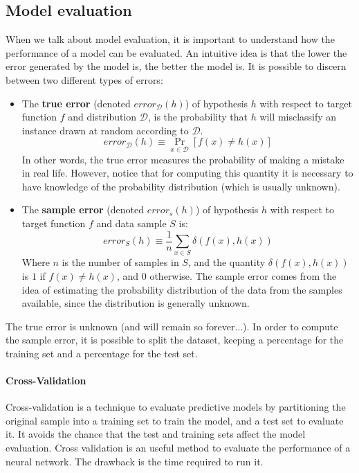 \subsection{Model evaluation}
When we talk about model evaluation, it is important to understand how the performance of a model can be evaluated. An intuitive idea is that the lower the error generated by the model is, the better the model is. It is possible to discern between two different types of errors:
\begin{itemize}
	\item The \textbf{true error} (denoted $error_{\mathcal{D}}(h)$) of hypothesis $h$ with respect to target function $f$ and distribution $\mathcal{D}$, is the probability that $h$ will misclassify an instance drawn at random according to $\mathcal{D}$.
	$$error_{\mathcal{D}}(h) \equiv \operatorname{Pr}_{x \in \mathcal{D}} \left[f(x) \neq h(x)\right]$$ 
	In other words, the true error measures the probability of making a mistake in real life. However, notice that for computing this quantity it is necessary to have knowledge of the probability distribution (which is usually unknown).
	
	\item The \textbf{sample error} (denoted $error_{s}(h)$) of hypothesis $h$ with respect to target function $f$ and data sample $S$ is:
	$$error_{S}(h) \equiv \frac{1}{n} \sum_{x \in S} \delta (f(x) , h(x))$$ 
	Where $n$ is the number of samples in $S$, and the quantity $\delta(f(x), h(x))$ is $1$ if $f(x) \neq h(x)$, and $0$ otherwise. The sample error comes from the idea of estimating the probability distribution of the data from the samples available, since the distribution is generally unknown.
\end{itemize}

The true error is unknown (and will remain so forever$\dots$). In order to compute the sample error, it is possible to split the dataset, keeping a percentage for the training set and a percentage for the test set.
\paragraph{Cross-Validation} Cross-validation is a technique to evaluate predictive models by partitioning the original sample into a training set to train the model, and a test set to evaluate it. It avoids the chance that the test and training sets affect the model evaluation. 
Cross validation is an useful method to evaluate the performance of a neural network. The drawback is the time required to run it.

